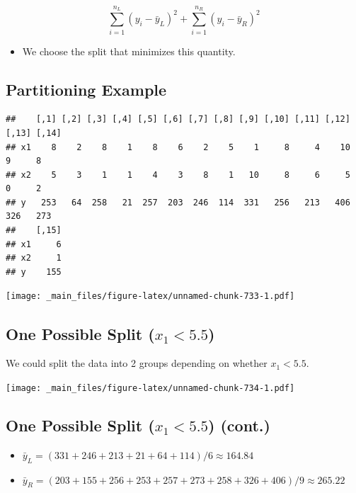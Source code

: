 \documentclass[]{book}
\providecommand{\tightlist}{%
  \setlength{\itemsep}{0pt}\setlength{\parskip}{0pt}}
\begin{document}
\[ \displaystyle\sum_{i=1}^{n_L} (y_i -\bar{y}_L)^2 + \displaystyle\sum_{i=1}^{n_R} (y_i -\bar{y}_R)^2
\]

\begin{itemize}
\tightlist
\item
  We choose the split that minimizes this quantity.
\end{itemize}

\subsection{Partitioning Example}\label{partitioning-example}

\begin{verbatim}
##    [,1] [,2] [,3] [,4] [,5] [,6] [,7] [,8] [,9] [,10] [,11] [,12] [,13] [,14]
## x1    8    2    8    1    8    6    2    5    1     8     4    10     9     8
## x2    5    3    1    1    4    3    8    1   10     8     6     5     0     2
## y   253   64  258   21  257  203  246  114  331   256   213   406   326   273
##    [,15]
## x1     6
## x2     1
## y    155
\end{verbatim}

\texttt{[image: \_main\_files/figure-latex/unnamed-chunk-733-1.pdf]}

\subsection{\texorpdfstring{One Possible Split
(\(x_1 < 5.5\))}{One Possible Split (x\_1 \textless{} 5.5)}}\label{one-possible-split-x_1-5.5}

We could split the data into 2 groups depending on whether
\(x_1 < 5.5\).

\texttt{[image: \_main\_files/figure-latex/unnamed-chunk-734-1.pdf]}

\subsection{\texorpdfstring{One Possible Split (\(x_1 < 5.5\))
(cont.)}{One Possible Split (x\_1 \textless{} 5.5) (cont.)}}\label{one-possible-split-x_1-5.5-cont.}

\begin{itemize}
\tightlist
\item
  \(\bar{y}_L = (331+246+213+21+64+114)/6 \approx 164.84\)\\
\item
  \(\bar{y}_R = (203+155+256+253+257+273+258+326+406)/9 \approx 265.22\)
\end{itemize}
\end{document}
